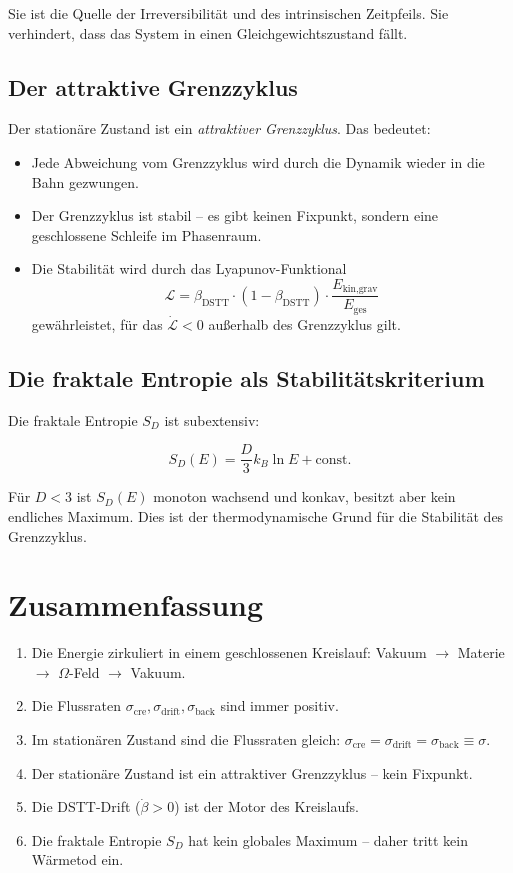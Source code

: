 Sie ist die Quelle der Irreversibilität und des intrinsischen Zeitpfeils. Sie verhindert, dass das System in einen Gleichgewichtszustand fällt.

\subsection{Der attraktive Grenzzyklus}

Der stationäre Zustand ist ein \emph{attraktiver Grenzzyklus}. Das bedeutet:

\begin{itemize}
    \item Jede Abweichung vom Grenzzyklus wird durch die Dynamik wieder in die Bahn gezwungen.
    \item Der Grenzzyklus ist stabil – es gibt keinen Fixpunkt, sondern eine geschlossene Schleife im Phasenraum.
    \item Die Stabilität wird durch das Lyapunov-Funktional 
    \[
    \mathcal{L} = \beta_{\text{DSTT}} \cdot (1 - \beta_{\text{DSTT}}) \cdot \frac{E_{\text{kin,grav}}}{E_{\text{ges}}}
    \]
    gewährleistet, für das \(\dot{\mathcal{L}} < 0\) außerhalb des Grenzzyklus gilt.
\end{itemize}

\subsection{Die fraktale Entropie als Stabilitätskriterium}

Die fraktale Entropie \(S_D\) ist subextensiv:

\begin{equation}
S_D(E) = \frac{D}{3} k_B \ln E + \text{const}. \tag{3.8}
\end{equation}

Für \(D < 3\) ist \(S_D(E)\) monoton wachsend und konkav, besitzt aber kein endliches Maximum. Dies ist der thermodynamische Grund für die Stabilität des Grenzzyklus.

\section{Zusammenfassung}

\begin{enumerate}
    \item Die Energie zirkuliert in einem geschlossenen Kreislauf: Vakuum \(\to\) Materie \(\to\) \(\Omega\)-Feld \(\to\) Vakuum.
    \item Die Flussraten \(\sigma_{\text{cre}}, \sigma_{\text{drift}}, \sigma_{\text{back}}\) sind immer positiv.
    \item Im stationären Zustand sind die Flussraten gleich: \(\sigma_{\text{cre}} = \sigma_{\text{drift}} = \sigma_{\text{back}} \equiv \sigma\).
    \item Der stationäre Zustand ist ein attraktiver Grenzzyklus – kein Fixpunkt.
    \item Die DSTT-Drift (\( \dot{\beta} > 0 \)) ist der Motor des Kreislaufs.
    \item Die fraktale Entropie \(S_D\) hat kein globales Maximum – daher tritt kein Wärmetod ein.
\end{enumerate}
